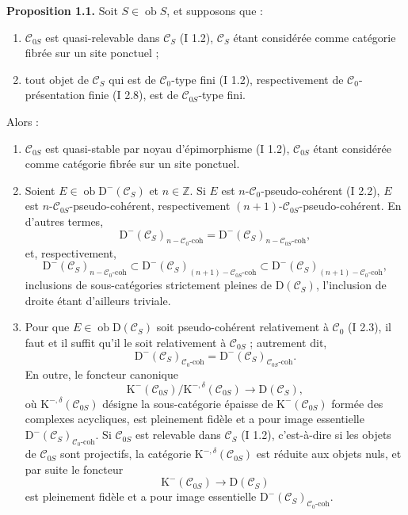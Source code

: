 \documentclass[11pt]{article}
\providecommand{\Ob}{\operatorname{ob}}
\begin{document}
\textbf{Proposition 1.1.} Soit $S\in\Ob S$, et supposons que :
\begin{enumerate}[label=(\roman*)]
\item $\mathcal C_{0S}$ est quasi-relevable dans $\mathcal C_S$ (I 1.2), $\mathcal C_S$ étant considérée comme catégorie fibrée sur un site ponctuel ;
\item tout objet de $\mathcal C_S$ qui est de $\mathcal C_0$-type fini (I 1.2), respectivement de $\mathcal C_0$-présentation finie (I 2.8), est de $\mathcal C_{0S}$-type fini.
\end{enumerate}
Alors :
\begin{enumerate}[label=\alph*)]
\item $\mathcal C_{0S}$ est quasi-stable par noyau d'épimorphisme (I 1.2), $\mathcal C_{0S}$ étant considérée comme catégorie fibrée sur un site ponctuel.
\item Soient $E\in\Ob \mathrm D^{-}(\mathcal C_S)$ et $n\in\mathbb Z$. Si $E$ est $n$-$\mathcal C_0$-pseudo-cohérent (I 2.2), $E$ est $n$-$\mathcal C_{0S}$-pseudo-cohérent, respectivement $(n+1)$-$\mathcal C_{0S}$-pseudo-cohérent. En d'autres termes,
\[
\mathrm D^{-}(\mathcal C_S)_{n-\mathcal C_0\text{-coh}}
=
\mathrm D^{-}(\mathcal C_S)_{n-\mathcal C_{0S}\text{-coh}},
\]
et, respectivement,
\[
\mathrm D^{-}(\mathcal C_S)_{n-\mathcal C_0\text{-coh}}
\subset
\mathrm D^{-}(\mathcal C_S)_{(n+1)-\mathcal C_{0S}\text{-coh}}
\subset
\mathrm D^{-}(\mathcal C_S)_{(n+1)-\mathcal C_0\text{-coh}},
\]
inclusions de sous-catégories strictement pleines de $\mathrm D(\mathcal C_S)$, l'inclusion de droite étant d'ailleurs triviale.
\item Pour que $E\in\Ob\mathrm D(\mathcal C_S)$ soit pseudo-cohérent relativement à $\mathcal C_0$ (I 2.3), il faut et il suffit qu'il le soit relativement à $\mathcal C_{0S}$ ; autrement dit,
\[
\mathrm D^{-}(\mathcal C_S)_{\mathcal C_0\text{-coh}}
=
\mathrm D^{-}(\mathcal C_S)_{\mathcal C_{0S}\text{-coh}}.
\]
En outre, le foncteur canonique
\[
\mathrm K^{-}(\mathcal C_{0S})/\mathrm K^{-,\delta}(\mathcal C_{0S})
\longrightarrow \mathrm D(\mathcal C_S),
\]
où $\mathrm K^{-,\delta}(\mathcal C_{0S})$ désigne la sous-catégorie épaisse de $\mathrm K^{-}(\mathcal C_{0S})$ formée des complexes acycliques, est pleinement fidèle et a pour image essentielle $\mathrm D^{-}(\mathcal C_S)_{\mathcal C_0\text{-coh}}$. Si $\mathcal C_{0S}$ est relevable dans $\mathcal C_S$ (I 1.2), c'est-à-dire si les objets de $\mathcal C_{0S}$ sont projectifs, la catégorie $\mathrm K^{-,\delta}(\mathcal C_{0S})$ est réduite aux objets nuls, et par suite le foncteur
\[
\mathrm K^{-}(\mathcal C_{0S})\longrightarrow \mathrm D(\mathcal C_S)
\]
est pleinement fidèle et a pour image essentielle $\mathrm D^{-}(\mathcal C_S)_{\mathcal C_0\text{-coh}}$.
\end{enumerate}
\end{document}
